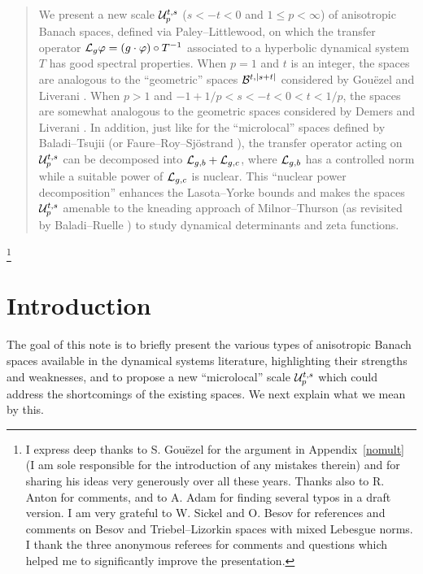 \documentclass[10pt,twoside]{amsart}
\begin{document}
\date{October 28, 2016} 
\begin{abstract}
We present a new scale $\mathcal{U}^{t,s}_p$ ($s<-t<0$ and $1\le p <\infty$) of anisotropic Banach spaces, 
defined via  Paley--Littlewood,  on which the transfer
operator $\mathcal{L}_g \varphi=  (g \cdot  \varphi ) \circ T^{-1}$
associated to a hyperbolic dynamical system $T$ has good spectral properties.
When $p=1$ and $t$ is an integer, the spaces are analogous to the ``geometric'' spaces
$\mathcal{B}^{t,|s+t|}$
considered by Gou\"ezel and Liverani \cite{GL1}. When $p>1$ and $-1+1/p<s<-t<0<t<1/p$,
the spaces are somewhat analogous to the geometric spaces  considered by Demers and Liverani \cite{DL}.
In addition, just like for the ``microlocal'' spaces defined 
by Baladi--Tsujii \cite{BT1}
(or Faure--Roy--Sj\"ostrand \cite{FRS}), the transfer operator acting on $\mathcal{U}^{t,s}_p$ can be decomposed
into $\mathcal{L}_{g,b}+\mathcal{L}_{g,c}$, where $\mathcal{L}_{g,b}$ has a controlled norm while a suitable power
of $\mathcal{L}_{g,c}$ is nuclear. This ``nuclear power decomposition''
enhances the Lasota--Yorke bounds and  makes the spaces $\mathcal{U}^{t,s}_p$
amenable to the kneading
approach of Milnor--Thurson \cite{MT}
(as revisited by Baladi--Ruelle  \cite{BaRu1, BaRu,Ba}) to study dynamical determinants and zeta functions.
\end{abstract}
\thanks{
I express deep thanks to S. Gou\"ezel for the argument  in Appendix~\ref{nomult} (I am
sole responsible for the introduction of any mistakes therein) and  for sharing
his ideas very generously over all these years. Thanks also to R. Anton for  comments,
and to A. Adam for finding several typos in a draft version. 
I am very grateful to W. Sickel and O. Besov for references and comments
on Besov and Triebel--Lizorkin spaces with mixed Lebesgue
norms. I thank the
three anonymous referees for comments and questions which helped me to significantly improve the presentation.
}


\maketitle

\section{Introduction}


The goal of this note is to briefly present the various types of anisotropic Banach spaces available
in the dynamical systems literature, highlighting their
strengths and weaknesses, and to
propose a new ``microlocal'' scale $\mathcal{U}^{t,s}_p$ which could address the shortcomings of the existing spaces.
We next   explain what we mean by this.
\end{document}

